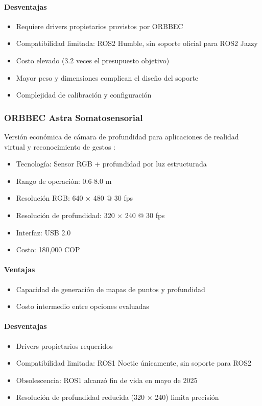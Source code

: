 \paragraph{Desventajas}
\begin{itemize}
    \item Requiere drivers propietarios provistos por ORBBEC
    \item Compatibilidad limitada: ROS2 Humble, sin soporte oficial para ROS2 Jazzy
    \item Costo elevado (3.2 veces el presupuesto objetivo)
    \item Mayor peso y dimensiones complican el diseño del soporte
    \item Complejidad de calibración y configuración
\end{itemize}

\subsubsection{ORBBEC Astra Somatosensorial}

Versión económica de cámara de profundidad para aplicaciones de realidad virtual y reconocimiento de gestos \cite{Orbbec2024Astra}:

\begin{itemize}
    \item Tecnología: Sensor RGB + profundidad por luz estructurada
    \item Rango de operación: 0.6-8.0 m
    \item Resolución RGB: 640 × 480 @ 30 fps
    \item Resolución de profundidad: 320 × 240 @ 30 fps
    \item Interfaz: USB 2.0
    \item Costo: 180,000 COP
\end{itemize}

\paragraph{Ventajas}
\begin{itemize}
    \item Capacidad de generación de mapas de puntos y profundidad
    \item Costo intermedio entre opciones evaluadas
\end{itemize}

\paragraph{Desventajas}
\begin{itemize}
    \item Drivers propietarios requeridos
    \item Compatibilidad limitada: ROS1 Noetic únicamente, sin soporte para ROS2
    \item Obsolescencia: ROS1 alcanzó fin de vida en mayo de 2025 \cite{ROS2EOL2024}
    \item Resolución de profundidad reducida (320 × 240) limita precisión
\end{itemize}

